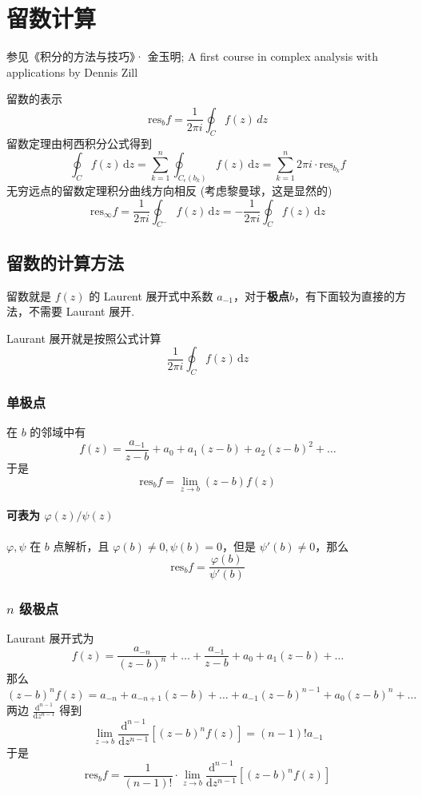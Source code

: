 \section{留数计算}

参见《积分的方法与技巧》· 金玉明; A first course in complex analysis with applications by Dennis Zill

留数的表示
\[
\mathrm{res}_{b}f=\frac{1}{2\pi i} \oint_{C}^{} f(z) \, dz
\]
留数定理由柯西积分公式得到
\[
\oint_{C} f(z) \, \mathrm{d}z =\sum_{k=1}^{n}\oint_{C_{\epsilon}(b_k)} f(z) \, \mathrm{d}z =\sum_{k=1}^{n} 2\pi i\cdot\mathrm{res}_{b_k}f
\]
无穷远点的留数定理积分曲线方向相反 (考虑黎曼球，这是显然的)
\[
\mathrm{res}_{\infty}f=\frac{1}{2\pi i}\oint_{C^{-}} f(z) \, \mathrm{d}z=-\frac{1}{2\pi i}\oint_{C} f(z) \, \mathrm{d}z
\]
\subsection{留数的计算方法}

留数就是 $f(z)$ 的 Laurent 展开式中系数 $a_{-1}$，对于\textbf{极点}$b$，有下面较为直接的方法，不需要 Laurant 展开.

\begin{remark}
Laurant 展开就是按照公式计算
\[
\frac{1}{2\pi i} \oint_{C} f(z) \, \mathrm{d}z 
\]
\end{remark}
\subsubsection{单极点}

在 $b$ 的邻域中有
\[
f(z)=\frac{a_{-1}}{z-b}+a_0+a_1(z-b)+a_2(z-b)^2+\dots
\]
于是
\[
\mathrm{res}_{b}f=\lim_{ z \to b } (z-b)f(z)
\]
\paragraph{可表为 \texorpdfstring{$\varphi(z)/\psi(z)$}{varphi(z)/psi(z)}}

$\varphi,\psi$ 在 $b$ 点解析，且 $\varphi(b)\neq0,\psi(b)=0$，但是 $\psi'(b)\neq0$，那么
\[
\mathrm{res}_{b}f=\frac{\varphi(b)}{\psi'(b)}
\]
\subsubsection{\texorpdfstring{$n$}{n} 级极点}

Laurant 展开式为
\[
f(z)=\frac{a_{-n}}{(z-b)^{n}}+\dots+\frac{a_{-1}}{z-b}+a_0+a_1(z-b)+\dots
\]
那么
\[
(z-b)^{n}f(z)=a_{-n}+a_{-n+1}(z-b)+\dots+a_{-1}(z-b)^{n-1}+a_0(z-b)^{n}+\dots
\]
两边 $\frac{\mathrm{d}^{n-1}}{\mathrm{d}z^{n-1}}$ 得到
\[
\lim_{ z \to b } \frac{\mathrm{d}^{n-1}}{\mathrm{d}z^{n-1}} [(z-b)^{n}f(z)]=(n-1)!a_{-1}
\]
于是
\[
\mathrm{res}_{b}f=\frac{1}{(n-1)!}\cdot \lim_{ z \to b } \frac{\mathrm{d}^{n-1}}{\mathrm{d}z^{n-1}} [(z-b)^{n}f(z)]
\]
